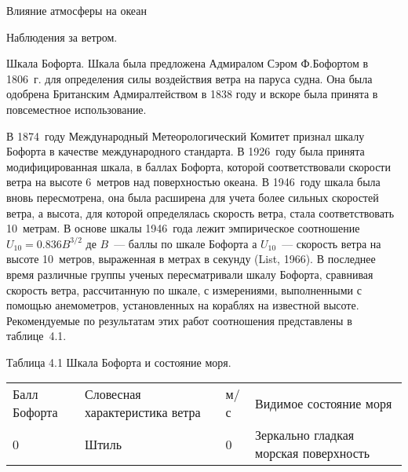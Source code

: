 \begin{chapter}{Влияние атмосферы на океан}
\begin{section}{Наблюдения за ветром.}
\begin{paragraph}{Шкала Бофорта.}
Шкала была предложена Адмиралом Сэром Ф.Бофортом в 1806~г. для
определения силы воздействия ветра на паруса судна. Она была одобрена
Британским Адмиралтейством в 1838 году и вскоре была принята в
повсеместное использование.
%


В 1874~году Международный Метеорологический Комитет признал шкалу
Бофорта в качестве международного стандарта. В 1926~году была принята
модифицированная шкала, в баллах Бофорта, которой соответствовали
скорости ветра на высоте 6~метров над поверхностью океана. В 1946~году
шкала была вновь пересмотрена, она была расширена для учета более
сильных скоростей ветра, а высота, для которой определялась скорость
ветра, стала соответствовать 10~метрам. В основе шкалы 1946~года лежит
эмпирическое соотношение $U_{10} = 0.836 B^{3/2}$ де $B$~--- баллы по
шкале Бофорта а $U_{10}$~--- скорость ветра на высоте 10~метров,
выраженная в метрах в секунду (List, 1966). В последнее время
различные группы ученых пересматривали шкалу Бофорта, сравнивая
скорость ветра, рассчитанную по шкале, с измерениями, выполненными с
помощью анемометров, установленных на кораблях на известной
высоте. Рекомендуемые по результатам этих работ соотношения
представлены в таблице~4.1.
%


Таблица 4.1 Шкала Бофорта и состояние моря.

\begin{tabular}{llll}
Балл Бофорта & Словесная характеристика ветра & м/с & Видимое состояние моря \\
0 & Штиль & 0 &
Зеркально гладкая морская поверхность \\


\end{tabular}
\end{paragraph}
\end{section}
\end{chapter}
